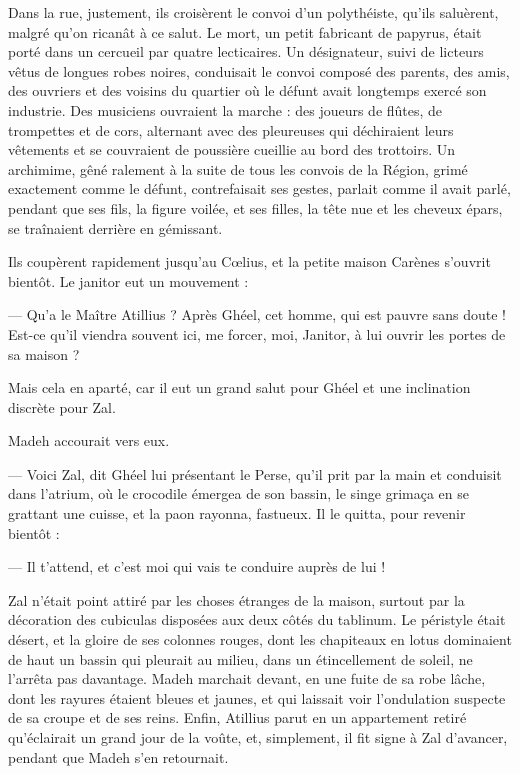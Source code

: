 \documentclass[a4paper, 11pt, oneside, polutonikogreek, french]{article}
\begin{document}
Dans la rue, justement, ils croisèrent le convoi d'un polythéiste, qu'ils saluèrent, malgré qu'on ricanât à ce salut. Le mort, un petit fabricant de papyrus, était porté dans un cercueil par quatre lecticaires. Un désignateur, suivi de licteurs vêtus de longues robes noires, conduisait le convoi composé des parents, des amis, des ouvriers et des voisins du quartier où le défunt avait longtemps exercé son industrie. Des musiciens ouvraient la marche : des joueurs de flûtes, de trompettes et de cors, alternant avec des pleureuses qui déchiraient leurs vêtements et se couvraient de poussière cueillie au bord des trottoirs. Un archimime, gêné ralement à la suite de tous les convois de la Région, grimé exactement comme le défunt, contrefaisait ses gestes, parlait comme il avait parlé, pendant que ses fils, la figure voilée, et ses filles, la tête nue et les cheveux épars, se traînaient derrière en gémissant.

Ils coupèrent rapidement jusqu'au Cœlius, et la petite maison Carènes s'ouvrit bientôt. Le janitor eut un mouvement :

--- Qu'a le Maître Atillius ? Après Ghéel, cet homme, qui est pauvre sans doute ! Est-ce qu'il viendra souvent ici, me forcer, moi, Janitor, à lui ouvrir les portes de sa maison ?

Mais cela en aparté, car il eut un grand salut pour Ghéel et une inclination discrète pour Zal.

Madeh accourait vers eux.

--- Voici Zal, dit Ghéel lui présentant le Perse, qu'il prit par la main et conduisit dans l'atrium, où le crocodile émergea de son bassin, le singe grimaça en se grattant une cuisse, et la paon rayonna, fastueux. Il le quitta, pour revenir bientôt :

--- Il t'attend, et c'est moi qui vais te conduire auprès de lui !

Zal n'était point attiré par les choses étranges de la maison, surtout par la décoration des cubiculas disposées aux deux côtés du tablinum. Le péristyle était désert, et la gloire de ses colonnes rouges, dont les chapiteaux en lotus dominaient de haut un bassin qui pleurait au milieu, dans un étincellement de soleil, ne l'arrêta pas davantage. Madeh marchait devant, en une fuite de sa robe lâche, dont les rayures étaient bleues et jaunes, et qui laissait voir l'ondulation suspecte de sa croupe et de ses reins. Enfin, Atillius parut en un appartement retiré qu'éclairait un grand jour de la voûte, et, simplement, il fit signe à Zal d'avancer, pendant que Madeh s'en retournait.
\end{document}
